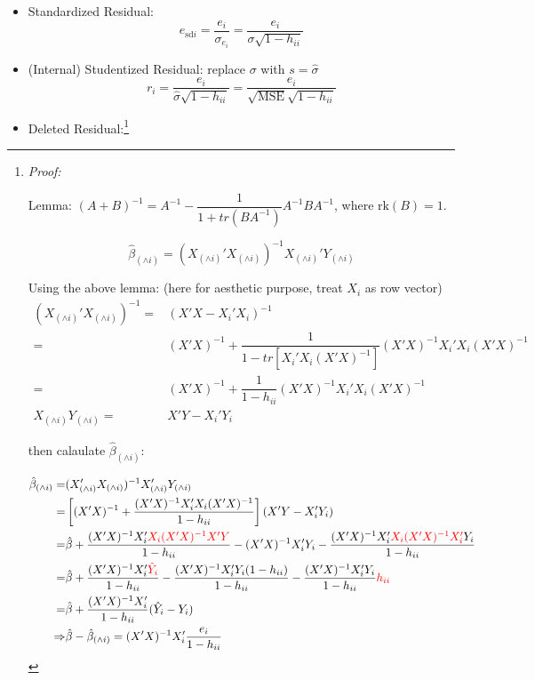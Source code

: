 \begin{itemize}[topsep=2pt,itemsep=2pt]
    \item Standardized Residual:
    \begin{equation}
         e_{\mathrm{sd}i}=\dfrac{e_i}{\sigma _{e_i}}=\dfrac{e_i}{\sigma \sqrt{1-h_{ii}}}
    \end{equation}
    \item (Internal) Studentized Residual: replace $ \sigma  $ with $ s=\hat{\sigma } $
    \begin{equation}\label{EqaInternalStudentizedResidual}
         r_i=\dfrac{e_i}{\hat{\sigma }\sqrt{1-h_{ii}}}=\dfrac{e_i}{\sqrt{\mathrm{MSE} }\sqrt{1-h_{ii}}}
    \end{equation}
    
    \item Deleted Residual:\footnote{
        \textit{Proof:}

        Lemma: $ (A+B)^{-1}=A^{-1}-\dfrac{1}{1+tr(BA^{-1})}A^{-1}BA^{-1} $, where $ \mathrm{rk}(B)=1  $.

        

        \begin{equation}
            \hat{\beta }_{(\wedge i)}=(X_{(\wedge i)}'X_{(\wedge i)})^{-1}X_{(\wedge i)}'Y_{(\wedge i)} 
        \end{equation}
        
        Using the above lemma: (here for aesthetic purpose, treat $ X_i $ as row vector)
        \begin{align*}
            (X_{(\wedge i)}'X_{(\wedge i)})^{-1}=&(X'X-X_i'X_i)^{-1}\\
            =&(X'X)^{-1}+\dfrac{1}{1-tr[X_i'X_i(X'X)^{-1}]}(X'X)^{-1}X_i'X_i(X'X)^{-1}\\
            =&(X'X)^{-1}+\dfrac{1}{1-h_{ii}}(X'X)^{-1}X_i'X_i(X'X)^{-1}\\
            X_{(\wedge i)}Y_{(\wedge i)}=&X'Y-X_i'Y_i
        \end{align*}

        then calaulate $ \hat{\beta }_{(\wedge i)} $:
   

        \begin{align}\label{EqaProofOfDeleteedResidual}
            \hat{\beta }_{(\wedge i)}=&(X_{(\wedge i)}'X_{(\wedge i)})^{-1}X_{(\wedge i)}'Y_{(\wedge i)}\notag \\
            =&\left[(X'X)^{-1}+\dfrac{(X'X)^{-1}X_i'X_i(X'X)^{-1}}{1-h_{ii}}\right]\left(X'Y-X_i'Y_i\right)\notag\\
            =&\hat{\beta }+\dfrac{(X'X)^{-1}X_i'{\color{red}X_i(X'X)^{-1}X'Y}}{1-h_{ii}}-(X'X)^{-1}X_i'Y_i-\dfrac{(X'X)^{-1}X_i'{\color{red}X_i(X'X)^{-1}X_i'}Y_i}{1-h_{ii}}\notag\\
            =&\hat{\beta }+\dfrac{(X'X)^{-1}X_i'{\color{red}\hat{Y}_i}}{1-h_{ii}}-\dfrac{(X'X)^{-1}X_i'Y_i(1-h_{ii})}{1-h_{ii}}-\dfrac{(X'X)^{-1}X_i'Y_i}{1-h_{ii}}{\color{red}h_{ii}}\notag\\
            =&\hat{\beta }+\dfrac{(X'X)^{-1}X_i'}{1-h_{ii}}(\hat{Y}_i-Y_i)\notag\\
            \Rightarrow &\hat{\beta }-\hat{\beta }_{(\wedge i)}=(X'X)^{-1}X_i'\dfrac{e_i}{1-h_{ii}}
        \end{align}
                    

}
\end{itemize}
